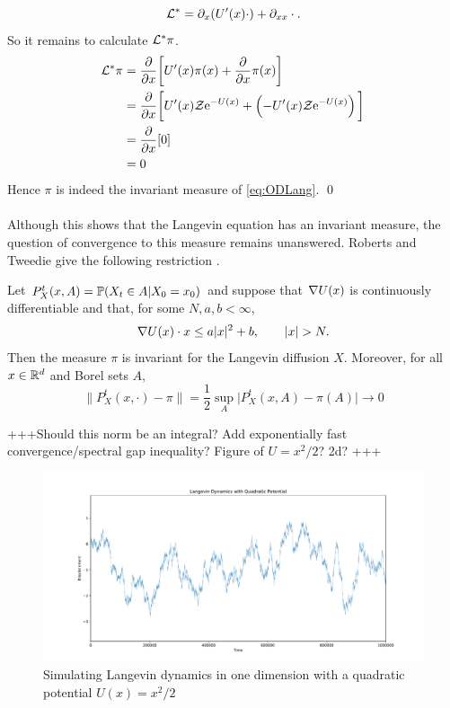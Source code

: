 \[\L^* = \partial_x(U'(x)\cdot)+\partial_{xx}\cdot . \]
So it remains to calculate \(\L^*\pi\). 
\begin{align*}
\L^*\pi &= \pd{}{x}\bigg\lbrack U'(x)\pi(x) + \pd{}{x}\pi(x)\bigg\rbrack\\
		&= \pd{}{x}\bigg\lbrack U'(x)\mathcal{Z}\e^{-U(x)}+ \left(-U'(x)\mathcal{Z}\e^{-U(x)}\right)\bigg\rbrack\\
		&= \pd{}{x}\lbrack 0 \rbrack\\
		&= 0
\end{align*}
Hence \(\pi\) is indeed the invariant measure of \eqref{eq:ODLang}. \qed 
\\
\\
Although this shows that the Langevin equation has an invariant measure, the question of convergence to this measure remains unanswered. Roberts and Tweedie give the following restriction \cite{RT96}.
\begin{theorem}
	Let \(P^t_X(x,A) = \P(X_t\in A | X_0 =x_0)\) and suppose that \(\grad U(x)\) is continuously differentiable and that, for some \(N,a,b < \infty\),
	\[\grad U(x)\cdot x \leq a|x|^2 + b, \qquad |x|>N. \]
	Then the measure \(\pi\) is invariant for the Langevin diffusion \(X\). Moreover, for all \(x \in \R^d \) and Borel sets \(A\),
	\[\|P^t_X(x,\cdot) - \pi \| = \frac{1}{2}\sup_A \big|P^t_X(x,A)-\pi(A)\big| \to 0\]

\end{theorem}
+++Should this norm be an integral? Add exponentially fast convergence/spectral gap inequality? Figure of \(U=x^2/2\)? 2d?  +++\\

\begin{figure}[ht]
	\centering
		\includegraphics[width=\linewidth]{quadraticLD.pdf}
	\caption{Simulating Langevin dynamics in one dimension with a quadratic potential \(U(x)=x^2/2\)}
	\label{fig:quadLD}
\end{figure} 

